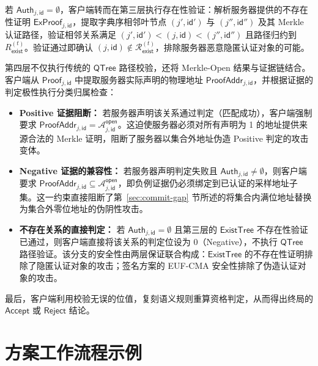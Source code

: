 若 $\mathsf{Auth}_{j,\mathsf{id}}=\emptyset$，客户端转而在第三层执行存在性验证：解析服务器提供的不存在性证明 $\mathsf{ExProof}_{j,\mathsf{id}}$，提取字典序相邻叶节点 $(j',\mathsf{id}')$ 与 $(j'',\mathsf{id}'')$ 及其 Merkle 认证路径，验证相邻关系满足 $(j',\mathsf{id}')<(j,\mathsf{id})<(j'',\mathsf{id}'')$ 且路径归约到 $R_{\mathsf{exist}}^{(t)}$。验证通过即确认 $(j,\mathsf{id})\notin\mathcal{R}_{\mathsf{exist}}^{(t)}$，排除服务器恶意隐匿认证对象的可能。

第四层不仅执行传统的 $\mathsf{QTree}$ 路径校验，还将 Merkle-Open 结果与证据链结合。客户端从 $\mathsf{Proof}_{j,\mathsf{id}}$ 中提取服务器实际声明的物理地址 $\mathsf{ProofAddr}_{j,\mathsf{id}}$，并根据证据的判定极性执行分类归属检查：
\begin{itemize}
    \item \textbf{Positive 证据阻断：} 若服务器声明该关系通过判定（匹配成功），客户端强制要求 $\mathsf{ProofAddr}_{j,\mathsf{id}}=\mathcal{A}_{j,\mathsf{id}}^{\mathsf{open}}$。这迫使服务器必须对所有声明为 1 的地址提供来源合法的 Merkle 证明，阻断了服务器以集合外地址伪造 Positive 判定的攻击变体。
    \item \textbf{Negative 证据的兼容性：} 若服务器声明判定失败且 $\mathsf{Auth}_{j,\mathsf{id}}\neq\emptyset$，则客户端要求 $\mathsf{ProofAddr}_{j,\mathsf{id}}\subseteq \mathcal{A}_{j,\mathsf{id}}^{\mathsf{open}}$，即负例证据仍必须绑定到已认证的采样地址子集。这一约束直接阻断了第~\ref{sec:commit-gap} 节所述的将集合内满位地址替换为集合外零位地址的伪阴性攻击。
    \item \textbf{不存在关系的直接判定：} 若 $\mathsf{Auth}_{j,\mathsf{id}}=\emptyset$ 且第三层的 $\mathsf{ExistTree}$ 不存在性验证已通过，则客户端直接将该关系的判定位设为 $0$（Negative），不执行 $\mathsf{QTree}$ 路径验证。该分支的安全性由两层保证联合构成：$\mathsf{ExistTree}$ 的不存在性证明排除了隐匿认证对象的攻击；签名方案的 EUF-CMA 安全性排除了伪造认证对象的攻击。
\end{itemize}
最后，客户端利用校验无误的位值，复刻语义规则重算资格判定，从而得出终局的 $\mathsf{Accept}$ 或 $\mathsf{Reject}$ 结论。

\section{方案工作流程示例}\label{sec:commit-workflow}

